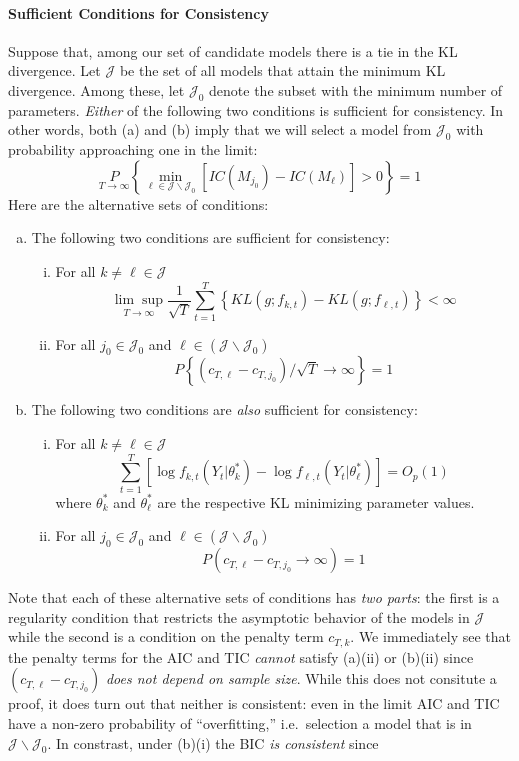 \paragraph{Sufficient Conditions for Consistency}
Suppose that, among our set of candidate models there is a tie in the KL divergence. Let $\mathcal{J}$ be the set of all models that attain the minimum KL divergence. Among these, let $\mathcal{J}_0$ denote the subset with the minimum number of parameters. \emph{Either} of the following two conditions is sufficient for consistency. In other words, both (a) and (b) imply that we will select a model from $\mathcal{J}_0$ with probability approaching one in the limit:
	$$\underset{T\rightarrow \infty}P\left\{ \underset{\ell \in \mathcal{J}\backslash \mathcal{J}_0}{\min} \left[ IC(M_{j_0}) - IC(M_\ell)\right] > 0 \right\} = 1$$
Here are the alternative sets of conditions: 
	\begin{enumerate}[(a)]
		\item The following two conditions are sufficient for consistency:
			\begin{enumerate}[(i)]
				\item For all $k \neq \ell \in \mathcal{J}$ 
					$$\underset{T\rightarrow \infty}{\lim\sup} \frac{1}{\sqrt{T}} \sum_{t=1}^T\left\{ KL(g; f_{k,t}) - KL(g;f_{\ell,t}) \right\}<\infty$$
				\item For all $j_0 \in \mathcal{J}_0$ and $\ell \in (\mathcal J \backslash \mathcal{J}_0)$
					$$P\left\{\left(c_{T,\ell} - c_{T,j_0} \right)/\sqrt{T} \rightarrow \infty \right\}= 1$$
			\end{enumerate}
		\item The following two conditions are \emph{also} sufficient for consistency:
			\begin{enumerate}[(i)]
				\item For all $k \neq \ell \in \mathcal{J}$ 
					$$\sum_{t=1}^T \left[\log f_{k,t}(Y_t|\theta^*_k) - \log f_{\ell,t}(Y_t|\theta^*_\ell) \right] = O_p(1)$$
				where $\theta^*_k$ and $\theta^*_\ell$ are the respective KL minimizing parameter values.
				\item For all $j_0 \in \mathcal{J}_0$ and $\ell \in (\mathcal J \backslash \mathcal{J}_0)$
					$$P\left(c_{T,\ell} - c_{T,j_0} \rightarrow \infty \right) = 1$$
			\end{enumerate}
	\end{enumerate}
Note that each of these alternative sets of conditions has \emph{two parts}: the first is a regularity condition that restricts the asymptotic behavior of the models in $\mathcal{J}$ while the second is a condition on the penalty term $c_{T,k}$. We immediately see that the penalty terms for the AIC and TIC \emph{cannot} satisfy (a)(ii) or (b)(ii) since $(c_{T,\ell} - c_{T,j_0})$ \emph{does not depend on sample size}. While this does not consitute a proof, it does turn out that neither is consistent: even in the limit AIC and TIC have a non-zero probability of ``overfitting,'' i.e.\ selection a model that is in $\mathcal{J}\backslash \mathcal{J}_0$. In constrast, under (b)(i) the BIC \emph{is consistent} since
